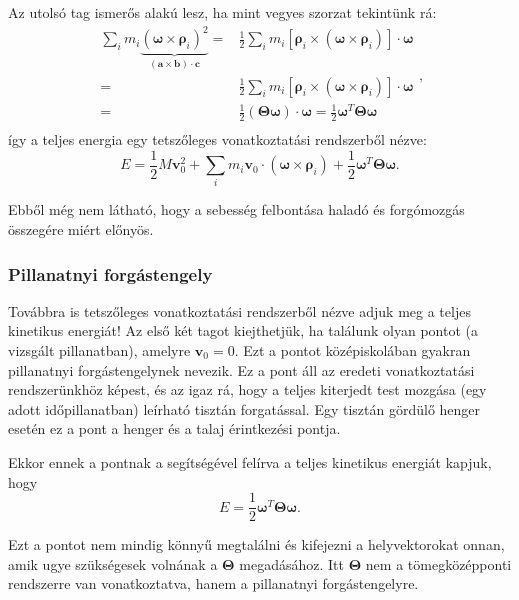 \documentclass[12pt,a4paper]{scrartcl}
\let\mathbf\bm
\begin{document}
Az utolsó tag ismerős alakú lesz, ha mint vegyes szorzat tekintünk rá:
\[\begin{aligned}
  \sum\limits_i {{m_i}\underbrace {{{\left( {{\mathbf{\omega }} \times {{\mathbf{\rho }}_i}} \right)}^2}}_{\left( {{\mathbf{a}} \times {\mathbf{b}}} \right) \cdot {\mathbf{c}}}}  =  & \frac{1}{2}\sum\limits_i {{m_i}} \left[ {{{\mathbf{\rho }}_i} \times \left( {{\mathbf{\omega }} \times {{\mathbf{\rho }}_i}} \right)} \right] \cdot {\mathbf{\omega }} \\ 
   =  & \frac{1}{2}\sum\limits_i {{m_i}} \left[ {{{\mathbf{\rho }}_i} \times \left( {{\mathbf{\omega }} \times {{\mathbf{\rho }}_i}} \right)} \right] \cdot {\mathbf{\omega }} \\ 
   =  & \frac{1}{2}\left( {{\mathbf{\Theta \omega }}} \right) \cdot {\mathbf{\omega }} = \frac{1}{2}{{\mathbf{\omega }}^T}{\mathbf{\Theta \omega }} \\ 
\end{aligned},\]
így a teljes energia egy tetszőleges vonatkoztatási rendszerből nézve:
\[E = \frac{1}{2}M{\mathbf{v}}_0^2 + \sum\limits_i {{m_i}{{\mathbf{v}}_0} \cdot \left( {{\mathbf{\omega }} \times {{\mathbf{\rho }}_i}} \right)}  + \frac{1}{2}{{\mathbf{\omega }}^T}{\mathbf{\Theta \omega }}.\]

Ebből még nem látható, hogy a sebesség felbontása haladó és forgómozgás összegére miért előnyös.
\subsubsection{Pillanatnyi forgástengely}
Továbbra is tetszőleges vonatkoztatási rendszerből nézve adjuk meg a teljes kinetikus energiát! Az első két tagot kiejthetjük, ha találunk olyan pontot (a vizsgált pillanatban), amelyre ${{\mathbf{v}}_0} = 0$. Ezt a pontot középiskolában gyakran pillanatnyi forgástengelynek nevezik. Ez a pont áll az eredeti vonatkoztatási rendszerünkhöz képest, és az igaz rá, hogy a teljes kiterjedt test mozgása (egy adott időpillanatban) leírható tisztán forgatással. Egy tisztán gördülő henger esetén ez a pont a henger és a talaj érintkezési pontja.

Ekkor ennek a pontnak a segítségével felírva a teljes kinetikus energiát kapjuk, hogy
\[E = \frac{1}{2}{{\mathbf{\omega }}^T}{\mathbf{\Theta \omega }}.\]

Ezt a pontot nem mindig könnyű megtalálni és kifejezni a helyvektorokat onnan, amik ugye szükségesek volnának a ${\mathbf{\Theta }}$ megadásához. Itt ${\mathbf{\Theta }}$ nem a tömegközépponti rendszerre van vonatkoztatva, hanem a pillanatnyi forgástengelyre.
\end{document}
